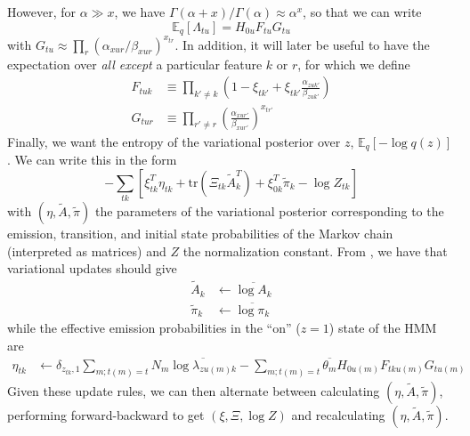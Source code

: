 \documentclass[10pt,letterpaper]{article}
\begin{document}
However, for $\alpha \gg x$, we have $\Gamma(\alpha + x)/\Gamma(\alpha) \approx \alpha^x$, so that we can write
\begin{equation}
    \label{HFG}
    \mathbb{E}_q[\Lambda_{tu}] = H_{0u} F_{tu} G_{tu}
\end{equation}
with $G_{tu} \approx \prod_r (\alpha_{xur}/\beta_{xur})^{x_{tr}}$. In addition, it will later be useful to have the expectation over \emph{all except} a particular feature $k$ or $r$, for which we define
\begin{align}
    \label{F}
    F_{tuk} &\equiv \prod_{k'\neq k} \left(1 - \xi_{tk'} + \xi_{tk'} \frac{\alpha_{zuk'}}{\beta_{zuk'}} \right) \\
    \label{G}
    G_{tur} &\equiv \prod_{r' \neq r} \left(\frac{\alpha_{xur'}}{\beta_{xur'}} \right)^{x_{tr'}}
\end{align}
Finally, we want the entropy of the variational posterior over $z$, $\mathbb{E}_q[-\log q(z)]$. We can write this in the form
\begin{equation}
    -\sum_{tk} \left[
        \xi_{tk}^T\eta_{tk} + \text{tr}\left(\Xi_{tk} \tilde{A}_k^T \right)
        + \xi_{0k}^T\tilde{\pi}_k
        - \log Z_{tk}
    \right]
\end{equation}
with $(\eta, \tilde{A}, \tilde{\pi})$ the parameters of the variational posterior corresponding to the emission, transition, and initial state probabilities of the Markov chain (interpreted as matrices) and $Z$ the normalization constant. From \cite{beal2003variational}, we have that variational updates should give
\begin{align}
    \label{A_update}
    \tilde{A}_k &\leftarrow \overline{\log A_k} \\
    \label{pi_update}
    \tilde{\pi}_k &\leftarrow \overline{\log \pi_k}
\end{align}
while the effective emission probabilities in the ``on'' ($z = 1$) state of the HMM are
\begin{align}
    \label{eta_update}
    \eta_{tk} &\leftarrow \delta_{z_{tk}, 1} \sum_{m; t(m) = t} N_m \overline{\log \lambda_{zu(m)k}}
    - \sum_{m; t(m) = t} \overline{\theta_m} H_{0u(m)} F_{tku(m)} G_{tu(m)}
\end{align}
Given these update rules, we can then alternate between calculating $(\eta, \tilde{A}, \tilde{\pi})$, performing forward-backward to get $(\xi, \Xi, \log Z)$ and recalculating $(\eta, \tilde{A}, \tilde{\pi})$.
\end{document}
